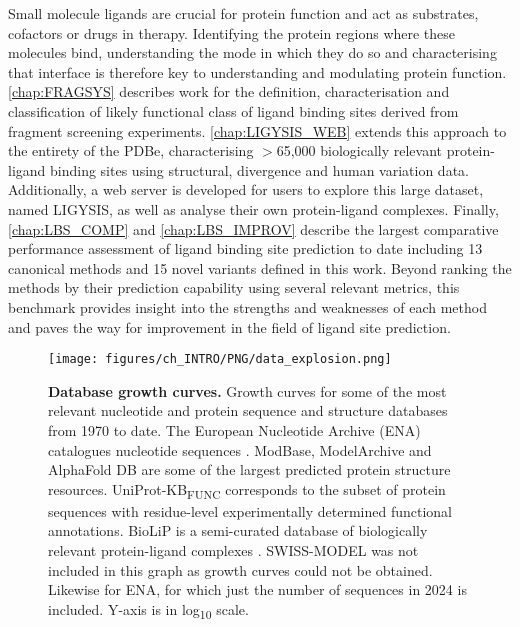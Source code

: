 Small molecule ligands are crucial for protein function and act as substrates, cofactors or drugs in therapy. Identifying the protein regions where these molecules bind, understanding the mode in which they do so and characterising that interface is therefore key to understanding and modulating protein function. \autoref{chap:FRAGSYS} describes work for the definition, characterisation and classification of likely functional class of ligand binding sites derived from fragment screening experiments. \autoref{chap:LIGYSIS_WEB} extends this approach to the entirety of the PDBe, characterising $>$65,000 biologically relevant protein-ligand binding sites using structural, divergence and human variation data. Additionally, a web server is developed for users to explore this large dataset, named LIGYSIS, as well as analyse their own protein-ligand complexes. Finally, \autoref{chap:LBS_COMP} and \autoref{chap:LBS_IMPROV} describe the largest comparative performance assessment of ligand binding site prediction to date including 13 canonical methods and 15 novel variants defined in this work. Beyond ranking the methods by their prediction capability using several relevant metrics, this benchmark provides insight into the strengths and weaknesses of each method and paves the way for improvement in the field of ligand site prediction.

\begin{figure}[htb!]
    \centering
    \texttt{[image: figures/ch\_INTRO/PNG/data\_explosion.png]}
    \caption[Database growth curves]{\textbf{Database growth curves.}  Growth curves for some of the most relevant nucleotide and protein sequence and structure databases from 1970 to date. The European Nucleotide Archive (ENA) catalogues nucleotide sequences \cite{LEINONEN_2010_ENA}. ModBase, ModelArchive and AlphaFold DB are some of the largest predicted protein structure resources. UniProt-KB\textsubscript{FUNC} corresponds to the subset of protein sequences with residue-level experimentally determined functional annotations. BioLiP is a semi-curated database of biologically relevant protein-ligand complexes \cite{YANG_2013_BIOLIP}. SWISS-MODEL was not included in this graph as growth curves could not be obtained. Likewise for ENA, for which just the number of sequences in 2024 is included. Y-axis is in log\textsubscript{10} scale.}
    \label{fig:data_explosion}
\end{figure}




